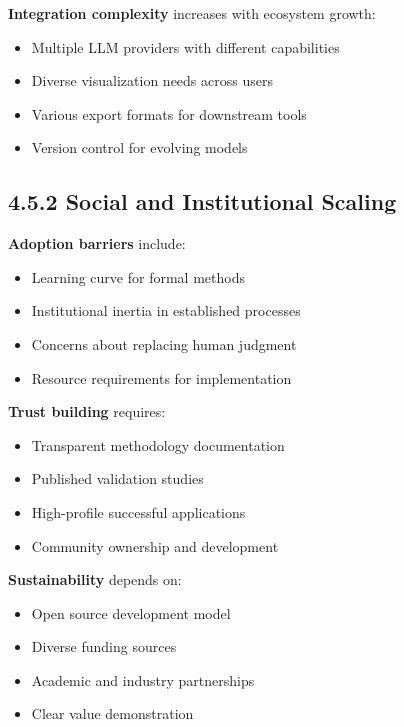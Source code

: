 \documentclass[
  11pt,
  letterpaper,
  openany]{book}
\providecommand{\tightlist}{%
  \setlength{\itemsep}{0pt}\setlength{\parskip}{0pt}}
\begin{document}
\textbf{Integration complexity} increases with ecosystem growth:

\begin{itemize}
\tightlist
\item
  Multiple LLM providers with different capabilities
\item
  Diverse visualization needs across users
\item
  Various export formats for downstream tools
\item
  Version control for evolving models
\end{itemize}

\subsection{4.5.2 Social and Institutional
Scaling}\label{sec-social-scaling}

\textbf{Adoption barriers} include:

\begin{itemize}
\tightlist
\item
  Learning curve for formal methods
\item
  Institutional inertia in established processes
\item
  Concerns about replacing human judgment
\item
  Resource requirements for implementation
\end{itemize}

\textbf{Trust building} requires:

\begin{itemize}
\tightlist
\item
  Transparent methodology documentation
\item
  Published validation studies
\item
  High-profile successful applications
\item
  Community ownership and development
\end{itemize}

\textbf{Sustainability} depends on:

\begin{itemize}
\tightlist
\item
  Open source development model
\item
  Diverse funding sources
\item
  Academic and industry partnerships
\item
  Clear value demonstration
\end{itemize}
\end{document}
